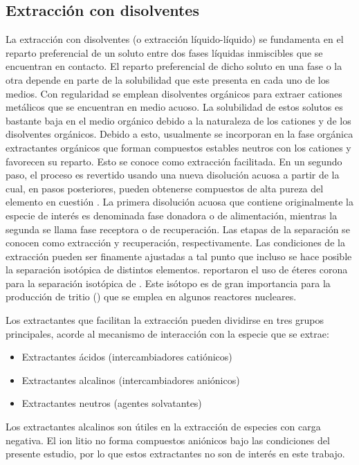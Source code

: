 \subsection{Extracción con disolventes}\label{sec:extr.disolv}
La extracción con disolventes (o extracción líquido-líquido) se fundamenta en el reparto preferencial de un soluto entre dos fases líquidas inmiscibles que se encuentran en contacto. El reparto preferencial de dicho soluto en una fase o la otra depende en parte de la solubilidad que este presenta en cada uno de los medios. Con regularidad se emplean disolventes orgánicos para extraer cationes metálicos que se encuentran en medio acuoso. La solubilidad de estos solutos es bastante baja en el medio orgánico debido a la naturaleza de los cationes y de los disolventes orgánicos. Debido a esto, usualmente se incorporan en la fase orgánica extractantes orgánicos que forman compuestos estables neutros con los cationes y favorecen su reparto. Esto se conoce como extracción facilitada. En un segundo paso, el proceso es revertido usando una nueva disolución acuosa a partir de la cual, en pasos posteriores, pueden obtenerse compuestos de alta pureza del elemento en cuestión \citep{NARBUTT2020}. La primera disolución acuosa que contiene originalmente la especie de interés es denominada fase donadora o de alimentación, mientras la segunda se llama fase receptora o de recuperación. Las etapas de la separación se conocen como extracción y recuperación, respectivamente. Las condiciones de la extracción pueden ser finamente ajustadas a tal punto que incluso se hace posible la separación isotópica de distintos elementos. \citet{LIU2018c} reportaron el uso de éteres corona para la separación isotópica de . Este isótopo es de gran importancia para la producción de tritio () que se emplea en algunos reactores nucleares.

Los extractantes  que facilitan la extracción pueden dividirse en tres grupos principales, acorde al mecanismo de interacción con la especie que se extrae:
\begin{itemize}
    \item Extractantes ácidos (intercambiadores catiónicos)
    \item Extractantes alcalinos (intercambiadores aniónicos)
    \item Extractantes neutros (agentes solvatantes)
\end{itemize}

Los extractantes alcalinos son útiles en la extracción de especies con carga negativa. El ion litio no forma compuestos aniónicos bajo las condiciones del presente estudio, por lo que estos extractantes no son de interés en este trabajo.


